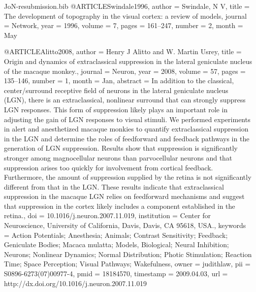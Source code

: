 \documentclass{article}
\begin{document}
\begin{filecontents}{JoN-resubmission.bib}
@ARTICLE{Swindale1996,
  author = {Swindale, N V},
  title = {{The development of topography in the visual cortex: a review of
	models}},
  journal = {Network},
  year = {1996},
  volume = {7},
  pages = {161--247},
  number = {2},
  month = {May}
}

@ARTICLE{Alitto2008,
  author = {Henry J Alitto and W. Martin Usrey},
  title = {Origin and dynamics of extraclassical suppression in the lateral
	geniculate nucleus of the macaque monkey.},
  journal = {Neuron},
  year = {2008},
  volume = {57},
  pages = {135--146},
  number = {1},
  month = {Jan},
  abstract = {In addition to the classical, center/surround receptive field of neurons
	in the lateral geniculate nucleus (LGN), there is an extraclassical,
	nonlinear surround that can strongly suppress LGN responses. This
	form of suppression likely plays an important role in adjusting the
	gain of LGN responses to visual stimuli. We performed experiments
	in alert and anesthetized macaque monkies to quantify extraclassical
	suppression in the LGN and determine the roles of feedforward and
	feedback pathways in the generation of LGN suppression. Results show
	that suppression is significantly stronger among magnocellular neurons
	than parvocellular neurons and that suppression arises too quickly
	for involvement from cortical feedback. Furthermore, the amount of
	suppression supplied by the retina is not significantly different
	from that in the LGN. These results indicate that extraclassical
	suppression in the macaque LGN relies on feedforward mechanisms and
	suggest that suppression in the cortex likely includes a component
	established in the retina.},
  doi = {10.1016/j.neuron.2007.11.019},
  institution = {Center for Neuroscience, University of California, Davis, Davis,
	CA 95618, USA.},
  keywords = {Action Potentials; Anesthesia; Animals; Contrast Sensitivity; Feedback;
	Geniculate Bodies; Macaca mulatta; Models, Biological; Neural Inhibition;
	Neurons; Nonlinear Dynamics; Normal Distribution; Photic Stimulation;
	Reaction Time; Space Perception; Visual Pathways; Wakefulness},
  owner = {judithlaw},
  pii = {S0896-6273(07)00977-4},
  pmid = {18184570},
  timestamp = {2009.04.03},
  url = {http://dx.doi.org/10.1016/j.neuron.2007.11.019}
}


\end{filecontents}
\end{document}
